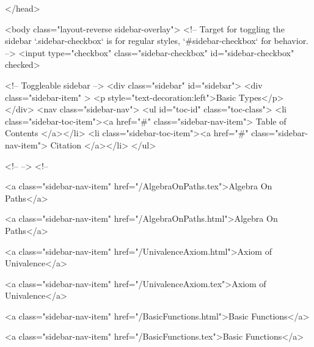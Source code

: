   
</head>




  <body class="layout-reverse sidebar-overlay">
    <!-- Target for toggling the sidebar `.sidebar-checkbox` is for regular
     styles, `#sidebar-checkbox` for behavior. -->
<input type="checkbox" class="sidebar-checkbox" id="sidebar-checkbox" checked>

<!-- Toggleable sidebar -->
<div class="sidebar" id="sidebar">
  <div class="sidebar-item" >
    <p style="text-decoration:left">Basic Types</p>
  </div>
  <nav class="sidebar-nav">
    <ul id="toc-id" class="toc-class">
  <li class="sidebar-toc-item"><a href="#" class="sidebar-nav-item"> Table of Contents </a></li>
  <li class="sidebar-toc-item"><a href="#" class="sidebar-nav-item"> Citation </a></li>
</ul>


    <!--  -->
    <!-- 
      
    
      
    
      
    
      
        
      
    
      
        
          <a class="sidebar-nav-item" href="/AlgebraOnPaths.tex">Algebra On Paths</a>
        
      
    
      
        
          <a class="sidebar-nav-item" href="/AlgebraOnPaths.html">Algebra On Paths</a>
        
      
    
      
        
          <a class="sidebar-nav-item" href="/UnivalenceAxiom.html">Axiom of Univalence</a>
        
      
    
      
        
          <a class="sidebar-nav-item" href="/UnivalenceAxiom.tex">Axiom of Univalence</a>
        
      
    
      
        
          <a class="sidebar-nav-item" href="/BasicFunctions.html">Basic Functions</a>
        
      
    
      
        
          <a class="sidebar-nav-item" href="/BasicFunctions.tex">Basic Functions</a>
        
      
    
      
        
